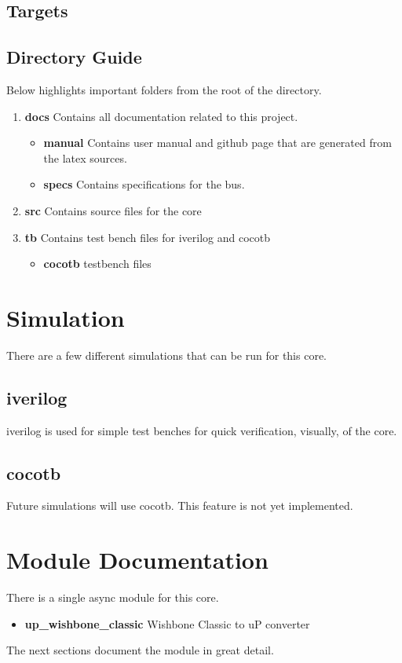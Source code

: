 \subsection{Targets}



\subsection{Directory Guide}

\par
Below highlights important folders from the root of the directory.

\begin{enumerate}
  \item \textbf{docs} Contains all documentation related to this project.
    \begin{itemize}
      \item \textbf{manual} Contains user manual and github page that are generated from the latex sources.
      \item \textbf{specs} Contains specifications for the bus.
    \end{itemize}
  \item \textbf{src} Contains source files for the core
  \item \textbf{tb} Contains test bench files for iverilog and cocotb
    \begin{itemize}
      \item \textbf{cocotb} testbench files
    \end{itemize}
\end{enumerate}

\newpage

\section{Simulation}
\par
There are a few different simulations that can be run for this core.

\subsection{iverilog}
\par
iverilog is used for simple test benches for quick verification, visually, of the core.

\subsection{cocotb}
\par
Future simulations will use cocotb. This feature is not yet implemented.

\newpage

\section{Module Documentation} \label{Module Documentation}

\par
There is a single async module for this core.

\begin{itemize}
\item \textbf{up\_wishbone\_classic} Wishbone Classic to uP converter\\
\end{itemize}
The next sections document the module in great detail.

